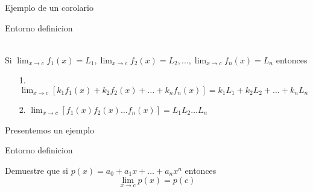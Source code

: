 \documentclass[]{beamer}
\theoremstyle{plain}
\begin{document}
\begin{frame}[fragile]{Ejemplo de un corolario}
\begin{source}{Entorno definicion}{}
\begin{corolario}\\
 Si \hspace{5pt}$\displaystyle \lim_{x\rightarrow c}f_1(x)=L_1, \displaystyle \lim_{x\rightarrow c}f_2(x)=L_2,\dots, \displaystyle \lim_{x\rightarrow c}f_n(x)=L_n $
 entonces
 \begin{enumerate}
 \item[1.] ${\displaystyle \lim_{x\rightarrow c}}[k_1f_1(x)+k_2f_2(x)+\dots+k_nf_n(x)]=k_1L_1+k_2L_2+\dots+k_nL_n $
 \item[2.]${\displaystyle \lim_{x\rightarrow c}}[f_1(x)f_2(x)\dots f_n(x)]=L_1L_2\dots L_n $
 \end{enumerate}
 \end{corolario}
\end{source}
\end{frame}
\begin{frame}[fragile]{Presentemos un ejemplo}
\begin{source}{Entorno definicion}{}
\begin{ejemplo}
Demuestre que si $p(x)=a_0+a_1x+\dots + a_nx^n$ entonces
 $$\lim_{x\rightarrow c}p(x)=p(c)$$
 \end{ejemplo}
\end{source}
\end{frame}
\end{document}
